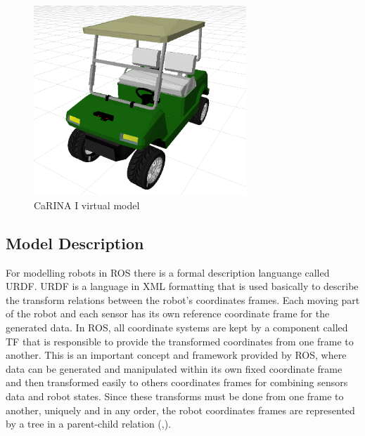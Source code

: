 \begin{figure}[ht]
	\begin{minipage}[b]{1\linewidth}
	    \centering
	    \includegraphics[width=8cm]{modelo_carina/carina_rviz_fundo_branco.png}
	 	\caption{CaRINA I virtual model}
	 	\label{fig:model}
	\end{minipage}
\end{figure}


\subsection{Model Description}

For modelling robots in ROS there is a formal description languange called URDF.
URDF is a language in XML formatting that is used basically to describe the
transform relations between the robot's coordinates frames. Each moving part of
the robot and each sensor has its own reference coordinate frame for the
generated data. In ROS, all coordinate systems are kept by a component called TF
that is responsible to provide the transformed coordinates from one frame to
another. This is an important concept and framework provided by ROS, where data
can be generated and manipulated within its own fixed coordinate frame and then
transformed easily to others coordinates frames for combining sensors data and
robot states. Since these transforms must be done from one frame to another,
uniquely and in any order, the robot coordinates frames are represented by a
tree in a parent-child relation (,).

